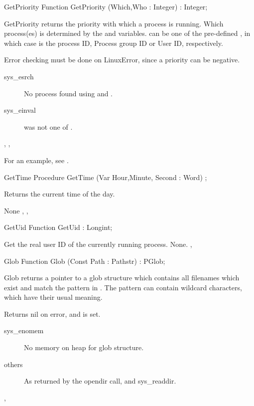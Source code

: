 \latex{}
\html{}
\begin{function}{GetPriority}
\Declaration
Function GetPriority (Which,Who : Integer) : Integer;

\Description

GetPriority returns the priority with which a process is running.
Which process(es) is determined by the  and  variables.
 can be one of the pre-defined , in which case  is the process ID, Process group ID or
User ID, respectively.

\Errors

 Error checking must be done on LinuxError, since a priority can be negative.
 \begin{description}
 \item[sys\_esrch] No process found using  and .
 \item[sys\_einval]  was not one of .
 \end{description}
 
\SeeAlso
{}, , 
\end{function}
For an example, see .
\begin{procedure}{GetTime}
\Declaration
Procedure GetTime  (Var Hour,Minute, Second : Word) ;

\Description

Returns the current time of the day.

\Errors
None
\SeeAlso
{}, ,  
\end{procedure}
\latex{}
\html{}
\begin{function}{GetUid}
\Declaration
Function GetUid  : Longint;

\Description
 Get the real user ID of the currently running process.
\Errors
None.
\SeeAlso
{},  
\end{function}
\latex{}
\html{}
\begin{function}{Glob}
\Declaration
Function Glob (Const Path : Pathstr) : PGlob;

\Description

Glob returns a pointer to a glob structure which contains all filenames which
exist and match the pattern in .
The pattern can contain wildcard characters, which have their
usual meaning.

\Errors
 Returns nil on error, and  is set.
\begin{description}
\item[sys\_enomem] No memory on heap for glob structure.
\item[others] As returned by the opendir call, and sys\_readdir.
\end{description}

\SeeAlso
{},  
\end{function}
